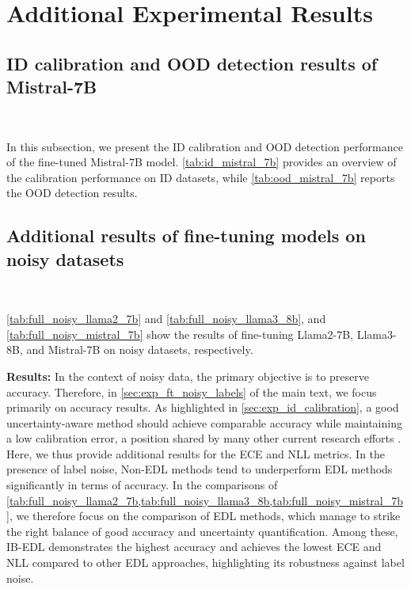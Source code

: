 \section{Additional Experimental Results}

\subsection{ID calibration and OOD detection results of Mistral-7B}~\label{sec:app:mistral_7b_results}

In this subsection, we present the ID calibration and OOD detection performance of the fine-tuned Mistral-7B model. \cref{tab:id_mistral_7b} provides an overview of the calibration performance on ID datasets, while \cref{tab:ood_mistral_7b} reports the OOD detection results.

\subsection{Additional results of fine-tuning models on noisy datasets}~\label{sec:app:full_noisy_ft_results}

\cref{tab:full_noisy_llama2_7b} and \cref{tab:full_noisy_llama3_8b}, and \cref{tab:full_noisy_mistral_7b} show the results of fine-tuning Llama2-7B, Llama3-8B, and Mistral-7B on noisy datasets, respectively.

\textbf{Results:} In the context of noisy data, the primary objective is to preserve accuracy. Therefore, in \cref{sec:exp_ft_noisy_labels} of the main text, we focus primarily on accuracy results. As highlighted in \cref{sec:exp_id_calibration}, a good uncertainty-aware method should achieve comparable accuracy while maintaining a low calibration error, a position shared by many other current research efforts \citep[see, e.g.,][]{chen2024redl}. %
Here, we thus provide additional results for the ECE and NLL metrics.
In the presence of label noise, Non-EDL methods tend to underperform EDL methods significantly in terms of accuracy. In the comparisons of \cref{tab:full_noisy_llama2_7b,tab:full_noisy_llama3_8b,tab:full_noisy_mistral_7b}, we therefore focus on the comparison of EDL methods, which manage to strike the right balance of good accuracy and uncertainty quantification. Among these, IB-EDL demonstrates the highest accuracy and achieves the lowest ECE and NLL compared to other EDL approaches, highlighting its robustness against label noise.

